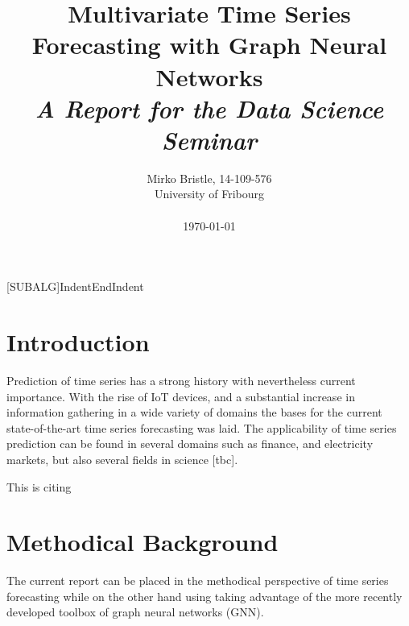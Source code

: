 \documentclass[letterpaper,twocolumn,12pt]{article}
\begin{document}
    [SUBALG]{Indent}{EndIndent}{}{\algorithmicend\ }%

    \title{\Large \bf Multivariate Time Series Forecasting with Graph Neural Networks \\
    \Medium \it A Report for the Data Science Seminar
    }

    \author{
            {\rm Mirko Bristle, 14-109-576}\\
        University of Fribourg \\
        \\
        \today
    }
    \maketitle


%


    \section{Introduction}

    Prediction of time series has a strong history with nevertheless current importance. With the rise of IoT devices, and a substantial
    increase in information gathering in a wide variety of domains the bases for the current state-of-the-art time series forecasting was laid.
    The applicability of time series prediction can be found in several domains such as finance, and electricity markets, but also several fields in science [tbc].


    This is citing \cite{wu2020connecting}


    \section{Methodical Background}
    The current report can be placed in the methodical perspective of time series forecasting while on the other hand using
    taking advantage of the more recently developed toolbox of graph neural networks (GNN).
\end{document}
